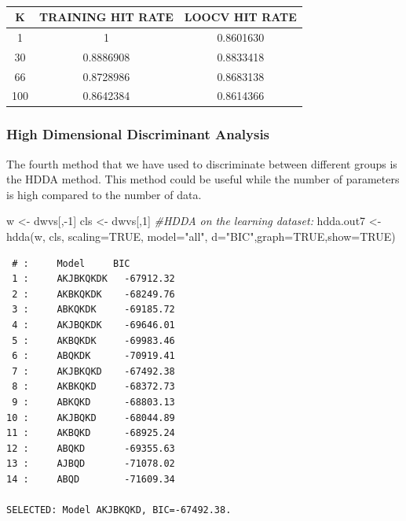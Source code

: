 \documentclass[
  11pt,
]{article}
\newenvironment{Shaded}{\begin{snugshade}}{\end{snugshade}}
\newcommand{\AttributeTok}[1]{\textcolor[rgb]{0.77,0.63,0.00}{#1}}
\newcommand{\CommentTok}[1]{\textcolor[rgb]{0.56,0.35,0.01}{\textit{#1}}}
\newcommand{\ConstantTok}[1]{\textcolor[rgb]{0.00,0.00,0.00}{#1}}
\newcommand{\DecValTok}[1]{\textcolor[rgb]{0.00,0.00,0.81}{#1}}
\newcommand{\FunctionTok}[1]{\textcolor[rgb]{0.00,0.00,0.00}{#1}}
\newcommand{\NormalTok}[1]{#1}
\newcommand{\OtherTok}[1]{\textcolor[rgb]{0.56,0.35,0.01}{#1}}
\newcommand{\SpecialCharTok}[1]{\textcolor[rgb]{0.00,0.00,0.00}{#1}}
\newcommand{\StringTok}[1]{\textcolor[rgb]{0.31,0.60,0.02}{#1}}
\begin{document}
\begin{table}[h!]
  \begin{center}
    \caption{}
    \label{tab:}
    \begin{tabular}{c|c|c} %
      \textbf{K} & \textbf{TRAINING HIT RATE} & \textbf{LOOCV HIT RATE}\\
      \hline
      1 & 1 & 0.8601630\\
      30 & 0.8886908 & 0.8833418\\
      66 & 0.8728986 & 0.8683138\\
      100 & 0.8642384 & 0.8614366\\
    \end{tabular}
  \end{center}
\end{table}

\hypertarget{high-dimensional-discriminant-analysis}{%
\subsubsection{High Dimensional Discriminant Analysis}\label{high-dimensional-discriminant-analysis}}

The fourth method that we have used to discriminate between different groups is the HDDA method. This method could be useful while the number of parameters is high compared to the number of data.

\begin{Shaded}
\begin{Highlighting}[]
\NormalTok{w }\OtherTok{\textless{}{-}}\NormalTok{ dwvs[,}\SpecialCharTok{{-}}\DecValTok{1}\NormalTok{]}
\NormalTok{cls }\OtherTok{\textless{}{-}}\NormalTok{ dwvs[,}\DecValTok{1}\NormalTok{]}
\CommentTok{\#HDDA on the learning dataset:}
\NormalTok{hdda.out7 }\OtherTok{\textless{}{-}} \FunctionTok{hdda}\NormalTok{(w, cls, }\AttributeTok{scaling=}\ConstantTok{TRUE}\NormalTok{, }\AttributeTok{model=}\StringTok{"all"}\NormalTok{, }\AttributeTok{d=}\StringTok{"BIC"}\NormalTok{,}\AttributeTok{graph=}\ConstantTok{TRUE}\NormalTok{,}\AttributeTok{show=}\ConstantTok{TRUE}\NormalTok{) }
\end{Highlighting}
\end{Shaded}

\begin{verbatim}
 # :     Model     BIC
 1 :     AKJBKQKDK   -67912.32  
 2 :     AKBKQKDK    -68249.76  
 3 :     ABKQKDK     -69185.72  
 4 :     AKJBQKDK    -69646.01  
 5 :     AKBQKDK     -69983.46  
 6 :     ABQKDK      -70919.41  
 7 :     AKJBKQKD    -67492.38  
 8 :     AKBKQKD     -68372.73  
 9 :     ABKQKD      -68803.13  
10 :     AKJBQKD     -68044.89  
11 :     AKBQKD      -68925.24  
12 :     ABQKD       -69355.63  
13 :     AJBQD       -71078.02  
14 :     ABQD        -71609.34  

SELECTED: Model AKJBKQKD, BIC=-67492.38.
\end{verbatim}
\end{document}
